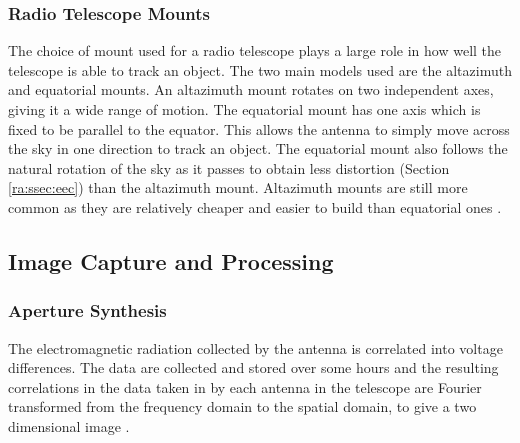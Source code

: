 \subsubsection{Radio Telescope Mounts}\label{ra:ssec:mount}
The choice of mount used for a radio telescope plays a large role in how well the telescope is able to track an object. The two main models used are the altazimuth and equatorial mounts. An altazimuth mount rotates on two independent axes, giving it a wide range of motion. The equatorial mount has one axis which is fixed to be parallel to the equator. This allows the antenna to simply move across the sky in one direction to track an object. The equatorial mount also follows the natural rotation of the sky as it passes to obtain less distortion (Section \ref{ra:ssec:eec}) than the altazimuth mount. Altazimuth mounts are still more common as they are relatively cheaper and easier to build than equatorial ones \citep{thompson2008interferometry}.
%
\subsection{Image Capture and Processing}\label{ra:sec:ic}
%
\subsubsection{Aperture Synthesis}\label{ra:ssec:rii}
The electromagnetic radiation collected by the antenna is correlated into voltage differences. The data are collected and stored over some hours and the resulting correlations in the data taken in by each antenna in the telescope are Fourier transformed from the frequency domain to the spatial domain, to give a two dimensional image \citep{sault1994multi}.
%
